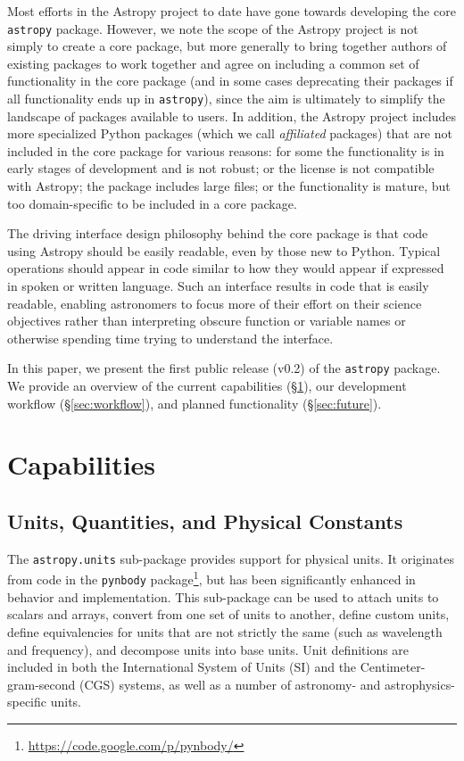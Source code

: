 \documentclass[traditabstract]{aa}
\newcommand{\astropy}{\texttt{astropy}\xspace}
\begin{document}
Most efforts in the Astropy project to date have gone towards developing the
core \astropy package. However, we note the scope of the Astropy project is
not simply to create a core package, but more generally to bring together
authors of existing packages to work together and agree on including a common
set of functionality in the core package (and in some cases deprecating their
packages if all functionality ends up in \astropy), since the aim is
ultimately to simplify the landscape of packages available to users. In
addition, the Astropy project includes more specialized Python packages (which
we call \textit{affiliated} packages) that are not included in the core
package for various reasons: for some the functionality is in early stages of
development and is not robust; or the license is not compatible with Astropy;
the package includes large files; or the functionality is mature, but too
domain-specific to be included in a core package.

The driving interface design philosophy behind the core package is that code using Astropy should be easily
readable, even by those new to Python. Typical operations should appear in
code similar to how they would appear if expressed in spoken or written
language. Such an interface results in code that is easily readable, enabling
astronomers to focus more of their effort on their science objectives rather
than interpreting obscure function or variable names or otherwise spending
time trying to understand the interface.

In this paper, we present the first public release (v0.2) of the \astropy
package. We provide an overview of the current capabilities
(\S\ref{sec:capabilities}), our development workflow (\S\ref{sec:workflow}),
and planned functionality (\S\ref{sec:future}).


\section{Capabilities}

\label{sec:capabilities}

\subsection{Units, Quantities, and Physical Constants}


The \texttt{astropy.units} sub-package provides support for physical units. It
originates from code in the \texttt{pynbody}
package\footnote{\url{https://code.google.com/p/pynbody/}}, but has been
significantly enhanced in behavior and implementation. This sub-package can be
used to attach units to scalars and arrays, convert from one set of units to
another, define custom units, define equivalencies for units that are not
strictly the same (such as wavelength and frequency), and decompose units
into base units. Unit definitions are included in both the International
System of Units (SI) and the Centimeter-gram-second (CGS) systems, as well as
a number of astronomy- and astrophysics-specific units.
\end{document}
